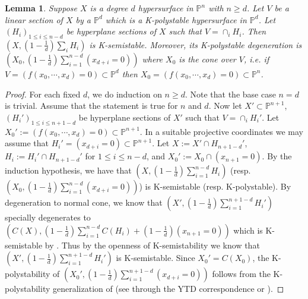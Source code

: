 \documentclass[11pt,reqno]{amsart}
\newcommand{\bP}{\mathbb{P}}
\newcommand{\YL}[1]{{\textcolor{blue}{[Yuchen: #1]}}}
\numberwithin{equation}{section}
\newtheorem{lem}[prop] {Lemma}
\theoremstyle{definition}
\begin{document}
\begin{lem}\label{lemmaconepolystable}
Suppose $X$ is a degree $d$ hypersurface in $\bP^n$ with $n\geq d$. Let $V$ be a linear section of $X$ by a $\bP^d$ which is a K-polystable hypersurface in $\bP^d$. Let $(H_i)_{1\leq i\leq n-d}$ be hyperplane sections of $X$ such that $V = \cap_i H_i$. Then $(X, (1-\frac{1}{d})\sum_i H_i)$ is K-semistable. Moreover, its K-polystable degeneration is $(X_0, (1-\frac{1}{d})\sum_{i=1}^{n-d} (x_{d+i}=0))$ where $X_0$ is the cone over $V$, i.e. if $V=(f(x_0,\cdots, x_d)=0)\subset\bP^d$ then $X_0=(f(x_0,\cdots, x_d)=0)\subset\bP^n$.
\end{lem}

\begin{proof}
For each fixed $d$, we do induction on $n\geq d$. Note that the base case  $n = d$  is trivial. Assume that the statement is true for $n$ and $d$. Now let $X'\subset \bP^{n+1}$, $(H_i')_{1\leq i\leq n+1-d}$ be hyperplane sections of $X'$ such that $V = \cap_i H_i'$. Let $X_0':= (f(x_0,\cdots, x_d) = 0) \subset \bP^{n+1}$. In a suitable projective coordinates we may assume that $H_i' = (x_{d+i} = 0)\subset \bP^{n+1}$. Let $X := X'\cap H_{n+1-d}'$, $H_i:= H_i'\cap H_{n+1-d}'$ for $1\leq i\leq n-d$, and $X_0':= X_0\cap (x_{n+1} = 0)$. By the induction hypothesis, we have that $(X, (1-\frac{1}{d})\sum_{i=1}^{n-d} H_i)$ (resp. $(X_0, (1-\frac{1}{d})\sum_{i=1}^{n-d} (x_{d+i}=0))$) is K-semistable (resp. K-polystable). By degeneration to normal cone, we know that $(X', (1-\frac{1}{d})\sum_{i=1}^{n+1-d} H_i')$ specially degenerates to $(C(X), (1-\frac{1}{d})\sum_{i=1}^{n-d} C(H_i) + (1-\frac{1}{d})(x_{n+1} = 0))$ which is K-semistable by \cite[Proposition 5.3]{LiXuStabilityofvaluations}. Thus by the openness of K-semistability \cite{BLX22, Xu20} we know that  $(X', (1-\frac{1}{d})\sum_{i=1}^{n+1-d} H_i')$ is K-semistable. Since $X_0'=C(X_0)$, the K-polystability of $(X_0', (1-\frac{1}{d})\sum_{i=1}^{n+1-d} (x_{d+i}=0))$ follows from the K-polystability generalization of \cite[Proposition 5.3]{LiXuStabilityofvaluations} (see \cite[Proposition 3.5]{LL19} through the YTD correspondence \cite{LiuXuZhuangHigherrankfinitegeneration} or \cite[Proposition 2.11]{LiuZhuangSharpnessofTianscriterion}).
\end{proof}
\end{document}
